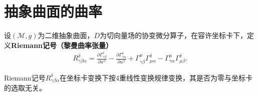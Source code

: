 \documentclass[../../main.tex]{subfiles}%
\begin{document}
\section{抽象曲面的曲率}

\begin{definition}
设$(\mathscr{M},g)$为二维抽象曲面，$D$为切向量场的协变微分算子，在容许坐标卡下，定义\textbf{Riemann记号（黎曼曲率张量）}
\begin{align}
R^\delta_{\gamma\beta\alpha}=\frac{\partial\Gamma^\delta_{\gamma\beta}}{\partial u^\alpha}-\frac{\partial\Gamma^\delta_{\gamma\alpha}}{\partial u^\beta}+\Gamma^\mu_{\gamma\beta}\Gamma^\delta_{\mu\alpha}-\Gamma^\mu_{\gamma\alpha}\Gamma^\delta_{\mu\beta}.
\label{eq:mo23423efSGE1}
\end{align}
\end{definition}

\begin{theorem}
Riemann记号$R^\delta_{\gamma\beta\alpha}$在坐标卡变换下按4重线性变换规律变换，其是否为零与坐标卡的选取无关。
\end{theorem}
\end{document}
